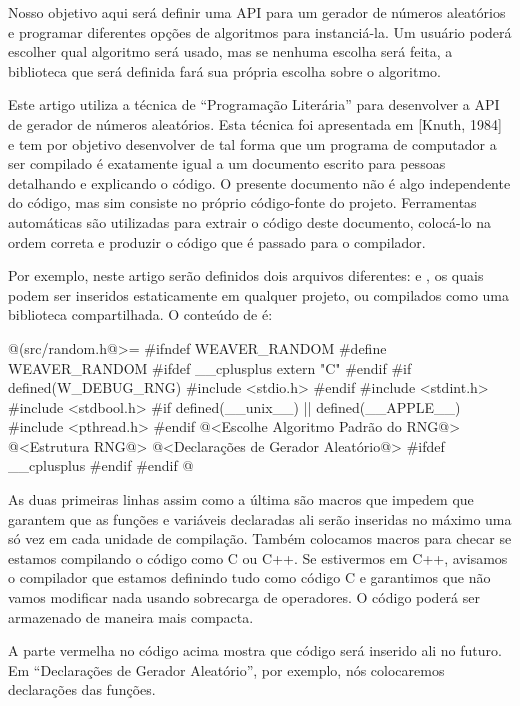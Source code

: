 Nosso objetivo aqui será definir uma API para um gerador de números
aleatórios e programar diferentes opções de algoritmos para
instanciá-la. Um usuário poderá escolher qual algoritmo será usado,
mas se nenhuma escolha será feita, a biblioteca que será definida fará
sua própria escolha sobre o algoritmo.


Este artigo utiliza a técnica de ``Programação Literária'' para
desenvolver a API de gerador de números aleatórios. Esta técnica foi
apresentada em [Knuth, 1984] e tem por objetivo desenvolver
 de tal forma que um programa de computador a ser compilado
é exatamente igual a um documento escrito para pessoas detalhando e
explicando o código. O presente documento não é algo independente do
código, mas sim consiste no próprio código-fonte do projeto.
Ferramentas automáticas são utilizadas para extrair o código deste
documento, colocá-lo na ordem correta e produzir o código que é
passado para o compilador.

Por exemplo, neste artigo serão definidos dois arquivos
diferentes:  e , os quais
podem ser inseridos estaticamente em qualquer projeto, ou compilados
como uma biblioteca compartilhada. O conteúdo de 
é:

\iniciocodigo
@(src/random.h@>=
#ifndef WEAVER_RANDOM
#define WEAVER_RANDOM
#ifdef __cplusplus
extern "C" {
#endif
#if defined(W_DEBUG_RNG)
#include <stdio.h>
#endif
#include <stdint.h>
#include <stdbool.h>
#if defined(__unix__) || defined(__APPLE__)
#include <pthread.h>
#endif
@<Escolhe Algoritmo Padrão do RNG@>
@<Estrutura RNG@>
@<Declarações de Gerador Aleatório@>
#ifdef __cplusplus
}
#endif
#endif
@
\fimcodigo

As duas primeiras linhas assim como a última são macros que impedem
que garantem que as funções e variáveis declaradas ali serão inseridas
no máximo uma só vez em cada unidade de compilação. Também colocamos
macros para checar se estamos compilando o código como C ou C++. Se
estivermos em C++, avisamos o compilador que estamos definindo tudo
como código C e garantimos que não vamos modificar nada usando
sobrecarga de operadores. O código poderá ser armazenado de maneira
mais compacta.

A parte vermelha no código acima mostra que código será inserido ali
no futuro. Em ``Declarações de Gerador Aleatório'', por exemplo, nós
colocaremos declarações das funções.

